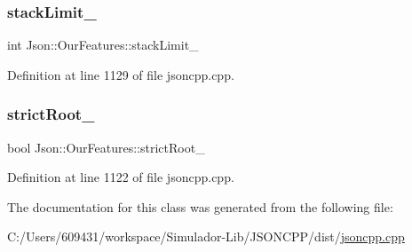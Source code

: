 \hypertarget{class_json_1_1_our_features_a9a786713902d14be6d57a08cc03ccfff}{}\label{class_json_1_1_our_features_a9a786713902d14be6d57a08cc03ccfff} 
\subsubsection{\texorpdfstring{stack\+Limit\+\_\+}{stackLimit\_}}
{\footnotesize\ttfamily int Json\+::\+Our\+Features\+::stack\+Limit\+\_\+}



Definition at line 1129 of file jsoncpp.\+cpp.

\hypertarget{class_json_1_1_our_features_a2095f66a776c0a4ae6cc931a0c94242e}{}\label{class_json_1_1_our_features_a2095f66a776c0a4ae6cc931a0c94242e} 
\subsubsection{\texorpdfstring{strict\+Root\+\_\+}{strictRoot\_}}
{\footnotesize\ttfamily bool Json\+::\+Our\+Features\+::strict\+Root\+\_\+}



Definition at line 1122 of file jsoncpp.\+cpp.



The documentation for this class was generated from the following file\+:\begin{DoxyCompactItemize}
\item 
C\+:/\+Users/609431/workspace/\+Simulador-\/\+Lib/\+J\+S\+O\+N\+C\+P\+P/dist/\hyperlink{jsoncpp_8cpp}{jsoncpp.\+cpp}\end{DoxyCompactItemize}
